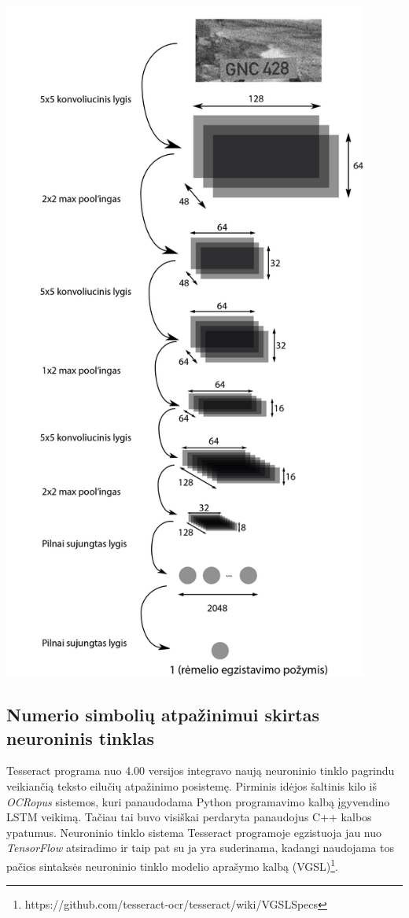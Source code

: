 \documentclass{VUMIFInfBakalaurinis}
\begin{document}
\begin{minipage}{\linewidth}
  \includegraphics[width=12cm]{topology.png}
  \label{fig:test}
\end{minipage}

\subsection{Numerio simbolių atpažinimui skirtas neuroninis tinklas}
Tesseract programa nuo 4.00 versijos integravo naują neuroninio tinklo pagrindu veikiančią teksto eilučių atpažinimo posistemę.
Pirminis idėjos šaltinis kilo iš \textit{OCRopus} sistemos, kuri panaudodama Python programavimo kalbą įgyvendino LSTM veikimą.
Tačiau tai buvo visiškai perdaryta panaudojus C++ kalbos ypatumus.
Neuroninio tinklo sistema Tesseract programoje egzistuoja jau nuo \textit{TensorFlow} atsiradimo ir taip pat su ja yra suderinama,
kadangi naudojama tos pačios sintaksės neuroninio tinklo modelio aprašymo kalbą (VGSL)\footnote{https://github.com/tesseract-ocr/tesseract/wiki/VGSLSpecs}.
\end{document}
